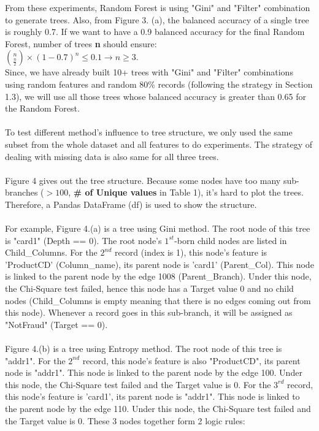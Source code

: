 \documentclass{article}
\begin{document}
From these experiments, Random Forest is using "Gini" and "Filter" combination to generate trees. Also, from Figure 3. (a), the balanced accuracy of a single tree is roughly 0.7. If we want to have a 0.9 balanced accuracy for the final Random Forest, number of trees \textbf{n} should ensure:\\
${n\choose \frac{n}{2}}\times(1-0.7)^n \leq 0.1 \rightarrow n\geq 3$.\\
Since, we have already built 10+ trees with "Gini" and "Filter" combinations using random features and random 80\% records (following the strategy in Section 1.3), we will use all those trees whose balanced accuracy is greater than 0.65 for the Random Forest.\\\\
To test different method's influence to tree structure, we only used the same subset from the whole dataset and all features to do experiments. The strategy of dealing with missing data is also same for all three trees. \\\\
Figure 4 gives out the tree structure. Because some nodes have too many sub-branches ($>100$, \textbf{\# of Unique values} in Table 1), it's hard to plot the trees. Therefore, a Pandas DataFrame (df) is used to show the structure. \\\\
For example, Figure 4.(a) is a tree using Gini method. The root node of this tree is "card1" (Depth == 0). The root node's $1^{st}$-born child nodes are listed in Child\_Columns. For the $2^{nd}$ record (index is 1), this node's feature is 'ProductCD' (Column\_name), its parent node is 'card1' (Parent\_Col). This node is linked to the parent node by the edge 1008 (Parent\_Branch). Under this node, the Chi-Square test failed, hence this node has a Target value 0 and no child nodes (Child\_Columns is empty meaning that there is no edges coming out from this node). Whenever a record goes in this sub-branch, it will be assigned as "NotFraud" (Target == 0). \\\\
Figure 4.(b) is a tree using Entropy method. The root node of this tree is "addr1". For the $2^{nd}$ record, this node's feature is also "ProductCD", its parent node is "addr1". This node is linked to the parent node by the edge 100. Under this node, the Chi-Square test failed and the Target value is 0. For the $3^{rd}$ record, this node's feature is 'card1', its parent node is "addr1". This node is linked to the parent node by the edge 110. Under this node, the Chi-Square test failed and the Target value is 0. These 3 nodes together form 2 logic rules:\\
\end{document}

